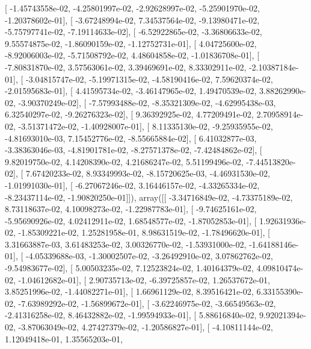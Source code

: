 \documentclass{article}
\begin{document}
       [ -1.45743558e-02,  -4.25801997e-02,  -2.92628997e-02,
         -5.25901970e-02,  -1.20378602e-01],
       [ -3.67248994e-02,   7.34537564e-02,  -9.13980471e-02,
         -5.75797741e-02,  -7.19114633e-02],
       [ -6.52922865e-02,  -3.36806633e-02,   9.55574875e-02,
         -1.86090159e-02,  -1.12752731e-01],
       [  4.04725600e-02,  -8.92006003e-02,  -5.71508792e-02,
          4.48604858e-02,  -1.01836708e-01],
       [ -7.80831870e-02,   3.57563061e-02,   3.39469691e-02,
          8.33302911e-02,  -2.10387184e-01],
       [ -3.04815747e-02,  -5.19971315e-02,  -4.58190416e-02,
          7.59620374e-02,  -2.01595683e-01],
       [  4.41595734e-02,  -3.46147965e-02,   1.49470539e-02,
          3.88262990e-02,  -3.90370249e-02],
       [ -7.57993488e-02,  -8.35321309e-02,  -4.62995438e-03,
          6.32540297e-02,  -9.26276323e-02],
       [  9.36392925e-02,   4.77209491e-02,   2.70958914e-02,
         -3.51371472e-02,  -1.40928007e-01],
       [  8.11335130e-02,  -9.25935955e-02,  -4.81693010e-03,
          7.15452776e-02,  -8.55665884e-02],
       [  6.41032877e-03,  -3.38363046e-03,  -4.81901781e-02,
         -8.27571378e-02,  -7.42484862e-02],
       [  9.82019750e-02,   4.14208390e-02,   4.21686247e-02,
          5.51199496e-02,  -7.44513820e-02],
       [  7.67420233e-02,   8.93349993e-02,  -8.15720625e-03,
         -4.46931530e-02,  -1.01991030e-01],
       [ -6.27067246e-02,   3.16446157e-02,  -4.33265334e-02,
         -8.23437114e-02,  -1.90820250e-01]]), array([[ -3.34716849e-02,  -4.73375189e-02,   8.73118637e-02,
          4.10098273e-02,  -1.22987783e-01],
       [ -9.74625161e-02,  -5.95690926e-02,   4.02412911e-02,
          1.68548577e-02,  -1.87052853e-01],
       [  1.92631936e-02,  -1.85309221e-02,   1.25281958e-01,
          8.98631519e-02,  -1.78496620e-01],
       [  3.31663887e-03,   3.61483253e-02,   3.00326770e-02,
         -1.53931000e-02,  -1.64188146e-01],
       [ -4.05339688e-03,  -1.30002507e-02,  -3.26492910e-02,
          3.07862762e-02,  -9.54983677e-02],
       [  5.00503235e-02,   7.12523824e-02,   1.40164379e-02,
          4.09810474e-02,  -1.04612682e-01],
       [  2.90735713e-02,  -6.39725857e-02,   1.26537672e-01,
          3.85251996e-02,  -1.44082271e-01],
       [  1.66961129e-02,   8.39516421e-02,   6.33155390e-02,
         -7.63989292e-02,  -1.56899672e-01],
       [ -3.62246975e-02,  -3.66549563e-02,  -2.41316258e-02,
          8.46432882e-02,  -1.99594933e-01],
       [  5.88616840e-02,   9.92021394e-02,  -3.87063049e-02,
          4.27427379e-02,  -1.20586827e-01],
       [ -4.10811144e-02,   1.12049418e-01,   1.35565203e-01,
\end{document}
